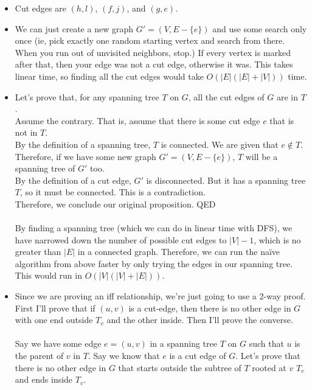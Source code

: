 \documentclass[11pt]{article}
\begin{document}
\begin{solution}
    \begin{itemize}
        \item Cut edges are $(h, l)$, $(f, j)$, and $(g, e)$.
        \item We can just create a new graph $G' = (V, E - \{e\})$ and use some search only once (ie, pick exactly one random starting vertex and search from there. When you run out of unvisited neighbors, stop.) If every vertex is marked after that, then your edge was not a cut edge, otherwise it was. This takes linear time, so finding all the cut edges would take $O(|E|(|E| + |V|))$ time.
        \item Let's prove that, for any spanning tree $T$ on $G$, all the cut edges of $G$ are in $T$. 
            \\ Assume the contrary. That is, assume that there is some cut edge $e$ that is not in $T$. 
            \\ By the definition of a spanning tree, $T$ is connected. We are given that $e \not \in T$. Therefore, if we have some new graph $G' = (V, E - \{e\})$, $T$ will be a spanning tree of $G'$ too.
            \\ By the definition of a cut edge, $G'$ is disconnected. But it has a spanning tree $T$, so it must be connected. This is a contradiction.
            \\ Therefore, we conclude our original proposition. QED
            \\ \\  By finding a spanning tree (which we can do in linear time with DFS), we have narrowed down the number of possible cut edges to $|V| - 1$, which is no greater than $|E|$ in a connected graph. Therefore, we can run the na\"{i}ve algorithm from above faster by only trying the edges in our spanning tree. This would run in $O(|V|(|V| + |E|))$.
        \item Since we are proving an iff relationship, we're just going to use a 2-way proof. First I'll prove that if $(u, v)$ is a cut-edge, then there is no other edge in $G$ with one end outside $T_v$ and the other inside. Then I'll prove the converse.
            \\ \\ Say we have some edge $e = (u, v)$ in a spanning tree $T$ on $G$ such that $u$ is the parent of $v$ in $T$. Say we know that $e$ is a cut edge of $G$. Let's prove that there is no other edge in $G$ that starts outside the subtree of $T$ rooted at $v$ $T_v$ and ends inside $T_v$.

\end{itemize}
\end{solution}
\end{document}
